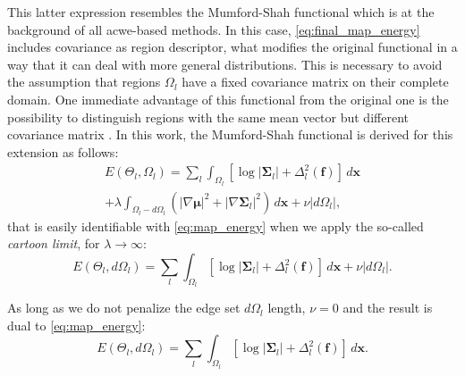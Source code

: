 This latter expression resembles the Mumford-Shah functional 
\citep{mumford_optimal_1989} which is at the background of all \gls{acwe}-based
methods. In this case, \eqref{eq:final_map_energy} includes covariance as
region descriptor, what modifies the original functional in a way that it 
can deal with more general distributions. This is necessary to avoid the 
assumption that regions $\Omega_l$ have a fixed covariance matrix on their 
complete domain. One immediate advantage of this functional from the original 
one is the possibility to distinguish regions with the same mean vector but 
different covariance matrix \citep{brox_local_2009}. In this work, the 
Mumford-Shah functional is derived for this extension as follows:
\begin{multline}
E(\Theta_l,\Omega_l) = \sum\limits_l \int_{\Omega_l} \left[ \log \left|\mathbf{\Sigma}_l\right| + \Delta^2_l (\mathbf{f}) \right] \,d\mathbf{x} \\
+ \lambda \int_{\Omega_l - d\Omega_l}  ( \left| \nabla \mathbf{\mu} \right| ^2 + \left| \nabla \mathbf{\Sigma}_l \right| ^2 ) \, d\mathbf{x} 
+ \nu |d\Omega_l|,
\end{multline}
that is easily identifiable with \eqref{eq:map_energy} when we apply 
the so-called \emph{cartoon limit}, 
for $\lambda \to \infty$:
\begin{equation}
E(\Theta_l,d\Omega_l) = \sum\limits_l \int_{\Omega_l} \left[ \log \left|\mathbf{\Sigma}_l\right| + \Delta^2_l (\mathbf{f}) \right] \,d\mathbf{x}
+ \nu |d\Omega_l|.
\end{equation}

As long as we do not penalize the edge set $d\Omega_l$ length, $\nu = 0$ and
the result is dual to \eqref{eq:map_energy}:
\begin{equation}
E(\Theta_l,d\Omega_l) = \sum\limits_l \int_{\Omega_l} \left[ \log \left|\mathbf{\Sigma}_l\right| + \Delta^2_l (\mathbf{f}) \right] \,d\mathbf{x}.
\end{equation}


